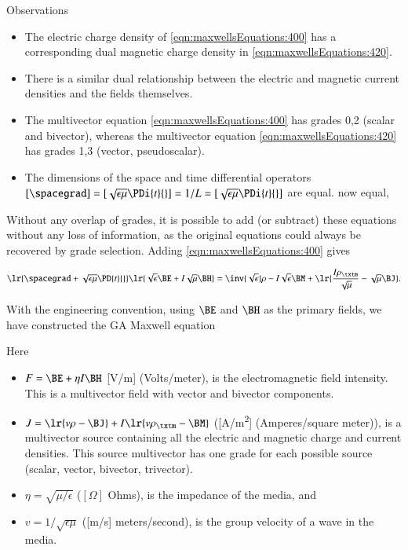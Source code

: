 Observations
\begin{itemize}
\item
The electric charge density of \cref{eqn:maxwellsEquations:400} has a corresponding dual magnetic charge density in \cref{eqn:maxwellsEquations:420}.
\item
There is a similar dual relationship between the electric and magnetic current densities and the fields themselves.
\item
The multivector equation \cref{eqn:maxwellsEquations:400} has grades 0,2 (scalar and bivector), whereas the multivector equation \cref{eqn:maxwellsEquations:420} has grades 1,3 (vector, pseudoscalar).
\item
The
dimensions of the space and time differential operators \( [\spacegrad] = [\sqrt{\epsilon\mu} \PDi{t}{}] = 1/L = [\sqrt{\epsilon\mu}\PDi{t}{}]\) are equal.
now equal,
\end{itemize}

Without any overlap of grades, it is possible to add (or subtract) these equations without any loss of information, as
the original equations could always be recovered by grade selection.
Adding \cref{eqn:maxwellsEquations:400} gives

\begin{dmath}\label{eqn:maxwellsEquations:440}
\lr{ \spacegrad + \sqrt{\epsilon\mu} \PD{t}{} }
\lr{ \sqrt{\epsilon} \BE
+
I \sqrt{\mu} \BH
}
=
\inv{\sqrt{\epsilon}} \rho
- I \sqrt{\epsilon} \BM
+\lr{
\frac{I \rho_\txtm}{\sqrt{\mu}}
- \sqrt{\mu} \BJ
}
.
\end{dmath}

With the engineering convention, using \( \BE \) and \( \BH \) as the primary fields, we have constructed the GA Maxwell equation


Here

\begin{itemize}
\item \( F = \BE + \eta I \BH \) [\si{V/m}] (Volts/meter), is the electromagnetic field intensity.  This is a multivector field with vector and bivector components.
\item \( J = \lr{ v \rho - \BJ } + I \lr{ v \rho_\txtm - \BM } \) ([\si{A/m^2}] (Amperes/square meter)),
is a multivector source containing all the electric and magnetic charge and current densities.  This source multivector has one grade for each possible source (scalar, vector, bivector, trivector).
\item \( \eta = \sqrt{\mu/\epsilon} \) (\( [\Omega] \) Ohms), is the impedance of the media, and
\item \( v = 1/\sqrt{\epsilon\mu} \) ([\si{m/s}] meters/second), is the group velocity of a wave in the media.
\end{itemize}

